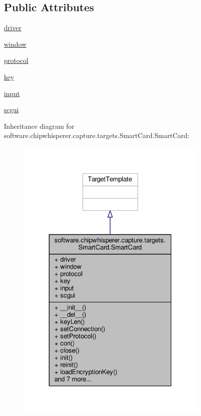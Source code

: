 \subsection*{Public Attributes}
\begin{DoxyCompactItemize}
\item 
\hyperlink{classsoftware_1_1chipwhisperer_1_1capture_1_1targets_1_1SmartCard_1_1SmartCard_a5baa55d0e921b83a3f98c05589c21e1a}{driver}
\item 
\hyperlink{classsoftware_1_1chipwhisperer_1_1capture_1_1targets_1_1SmartCard_1_1SmartCard_aa2af4947f4c6321899b42da2e09d34e1}{window}
\item 
\hyperlink{classsoftware_1_1chipwhisperer_1_1capture_1_1targets_1_1SmartCard_1_1SmartCard_a70bb91d5c2c8be604a549ed5ee23510a}{protocol}
\item 
\hyperlink{classsoftware_1_1chipwhisperer_1_1capture_1_1targets_1_1SmartCard_1_1SmartCard_aac6e85e066a550080b51a3954bae4392}{key}
\item 
\hyperlink{classsoftware_1_1chipwhisperer_1_1capture_1_1targets_1_1SmartCard_1_1SmartCard_a973299d481b616299f0fd3a9cba55bab}{input}
\item 
\hyperlink{classsoftware_1_1chipwhisperer_1_1capture_1_1targets_1_1SmartCard_1_1SmartCard_acb4bd44ef4b1ad21a36cf91e962b9de4}{scgui}
\end{DoxyCompactItemize}


Inheritance diagram for software.\+chipwhisperer.\+capture.\+targets.\+Smart\+Card.\+Smart\+Card\+:\nopagebreak
\begin{figure}[H]
\begin{center}
\leavevmode
\includegraphics[width=268pt]{d8/d85/classsoftware_1_1chipwhisperer_1_1capture_1_1targets_1_1SmartCard_1_1SmartCard__inherit__graph}
\end{center}
\end{figure}


